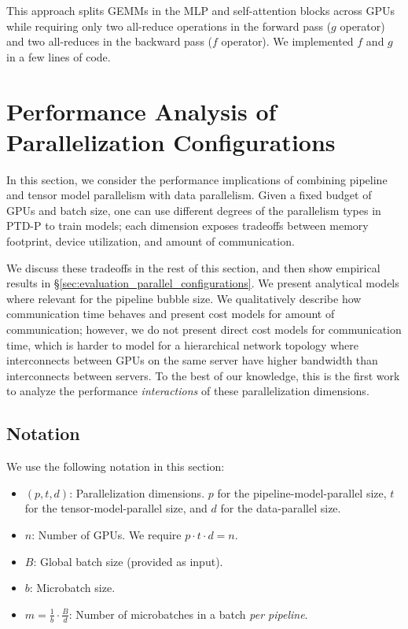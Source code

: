 This approach splits GEMMs in the MLP and self-attention blocks across GPUs while requiring only two all-reduce operations in the forward pass ($g$ operator) and two all-reduces in the backward pass ($f$ operator). We implemented $f$ and $g$ in a few lines of code.

\section{Performance Analysis of Parallelization Configurations}
\label{sec:parallelization_dimensions}

In this section, we consider the performance implications of combining pipeline and tensor model parallelism with data parallelism. Given a fixed budget of GPUs and batch size, one can use different degrees of the parallelism types in PTD-P to train models; each dimension exposes tradeoffs between memory footprint, device utilization, and amount of communication.

We discuss these tradeoffs in the rest of this section, and then show empirical results in \S\ref{sec:evaluation_parallel_configurations}. We present analytical models where relevant for the pipeline bubble size. We qualitatively describe how communication time behaves and present cost models for amount of communication; however, we do not present direct cost models for communication time, which is harder to model for a hierarchical network topology where interconnects between GPUs on the same server have higher bandwidth than interconnects between servers. To the best of our knowledge, this is the first work to analyze the performance \emph{interactions} of these parallelization dimensions.

\subsection{Notation}
We use the following notation in this section:

\begin{itemize}
    \item $(p, t, d)$: Parallelization dimensions. $p$ for the pipeline-model-parallel size, $t$ for the tensor-model-parallel size, and $d$ for the data-parallel size.
    \item $n$: Number of GPUs. We require $p \cdot t \cdot d = n$.
    \item $B$: Global batch size (provided as input).
    \item $b$: Microbatch size.
    \item $m=\frac{1}{b}\cdot\frac{B}{d}$: Number of microbatches in a batch \emph{per pipeline}.
\end{itemize}

